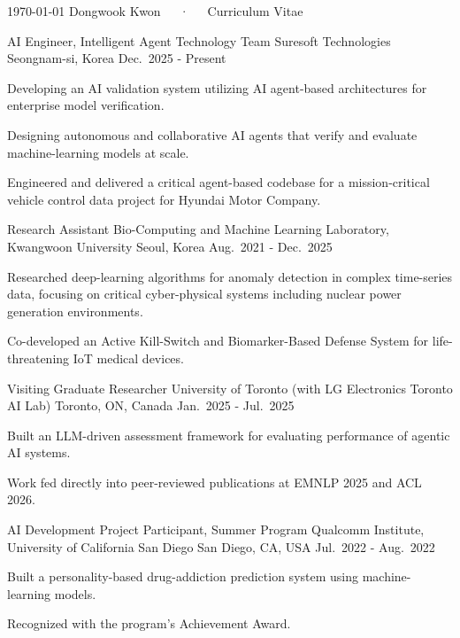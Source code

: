 \documentclass[11pt, letterpaper]{awesome-cv}
\begin{document}
\makecvheader[C]
\makecvfooter
  {\today}
  {Dongwook Kwon~~~·~~~Curriculum Vitae}
  {\thepage}

\begin{cventries}
  \cventry
    {AI Engineer, Intelligent Agent Technology Team}
    {Suresoft Technologies}
    {Seongnam-si, Korea}
    {Dec.\ 2025 - Present}
    {
      \begin{cvitems}
        \item {Developing an AI validation system utilizing AI agent-based architectures for enterprise model verification.}
        \item {Designing autonomous and collaborative AI agents that verify and evaluate machine-learning models at scale.}
        \item {Engineered and delivered a critical agent-based codebase for a mission-critical vehicle control data project for Hyundai Motor Company.}
      \end{cvitems}
    }
  \cventry
    {Research Assistant}
    {Bio-Computing and Machine Learning Laboratory, Kwangwoon University}
    {Seoul, Korea}
    {Aug.\ 2021 - Dec.\ 2025}
    {
      \begin{cvitems}
        \item {Researched deep-learning algorithms for anomaly detection in complex time-series data, focusing on critical cyber-physical systems including nuclear power generation environments.}
        \item {Co-developed an Active Kill-Switch and Biomarker-Based Defense System for life-threatening IoT medical devices.}
      \end{cvitems}
    }
  \cventry
    {Visiting Graduate Researcher}
    {University of Toronto (with LG Electronics Toronto AI Lab)}
    {Toronto, ON, Canada}
    {Jan.\ 2025 - Jul.\ 2025}
    {
      \begin{cvitems}
        \item {Built an LLM-driven assessment framework for evaluating performance of agentic AI systems.}
        \item {Work fed directly into peer-reviewed publications at EMNLP 2025 and ACL 2026.}
      \end{cvitems}
    }
  \cventry
    {AI Development Project Participant, Summer Program}
    {Qualcomm Institute, University of California San Diego}
    {San Diego, CA, USA}
    {Jul.\ 2022 - Aug.\ 2022}
    {
      \begin{cvitems}
        \item {Built a personality-based drug-addiction prediction system using machine-learning models.}
        \item {Recognized with the program's Achievement Award.}
      \end{cvitems}
    }
\end{cventries}
\end{document}
